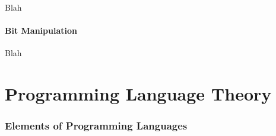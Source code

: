 Blah


\subsection{Bit Manipulation}

Blah

\newpage


\part*{Programming Language Theory}




\toclineskip
\section{Elements of Programming Languages}




